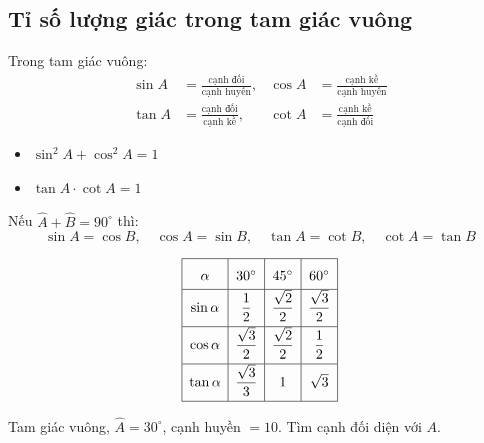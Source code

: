 \documentclass[12pt,a4paper]{article}
\begin{document}
\subsection{Tỉ số lượng giác trong tam giác vuông}

\begin{dinhnghia}
  Trong tam giác vuông:
  \begin{align*}
    \sin A &= \frac{\text{cạnh đối}}{\text{cạnh huyền}}, &
    \cos A &= \frac{\text{cạnh kề}}{\text{cạnh huyền}} \\[6pt]
    \tan A &= \frac{\text{cạnh đối}}{\text{cạnh kề}}, &
    \cot A &= \frac{\text{cạnh kề}}{\text{cạnh đối}}
  \end{align*}
\end{dinhnghia}

\begin{congthuc}
  \begin{itemize}
    \item $\sin^2 A + \cos^2 A = 1$
    \item $\tan A \cdot \cot A = 1$
  \end{itemize}
\end{congthuc}

\begin{tinhchat}[title={Hai góc phụ nhau}]
  Nếu $\widehat{A} + \widehat{B} = 90^\circ$ thì:
  \[\sin A = \cos B, \quad \cos A = \sin B, \quad \tan A = \cot B, \quad \cot A = \tan B\]
\end{tinhchat}

\begin{congthuc}[title={Góc đặc biệt}]
  \[
  \renewcommand{\arraystretch}{1.8}
  \begin{array}{|c|c|c|c|}
    \hline
    \alpha & 30^\circ & 45^\circ & 60^\circ \\
    \hline
    \sin\alpha & \dfrac{1}{2} & \dfrac{\sqrt{2}}{2} & \dfrac{\sqrt{3}}{2} \\[4pt]
    \hline
    \cos\alpha & \dfrac{\sqrt{3}}{2} & \dfrac{\sqrt{2}}{2} & \dfrac{1}{2} \\[4pt]
    \hline
    \tan\alpha & \dfrac{\sqrt{3}}{3} & 1 & \sqrt{3} \\[4pt]
    \hline
  \end{array}
  \]
\end{congthuc}

\begin{vidu}
  Tam giác vuông, $\widehat{A} = 30^\circ$, cạnh huyền $= 10$. Tìm cạnh đối diện với $A$.
\end{vidu}
\end{document}
